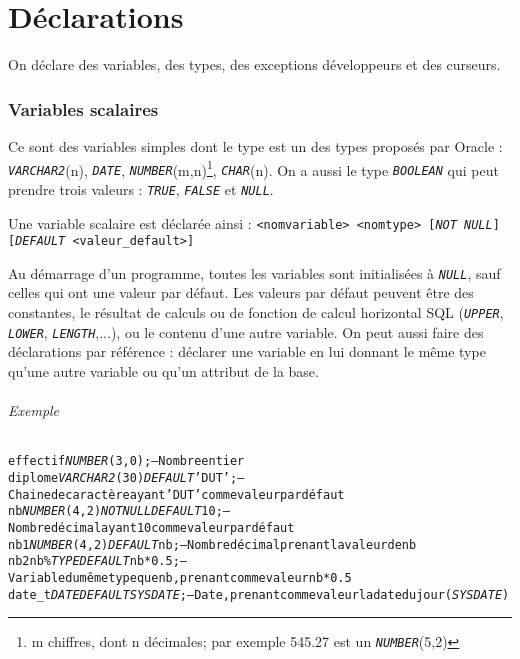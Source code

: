 \documentclass[10pt]{article}
\begin{document}
\newpage
\part{Déclarations}
	On déclare des variables, des types, des exceptions développeurs et des curseurs.
	
	\section{Variables scalaires}
		Ce sont des variables simples dont le type est un des types proposés par Oracle : \emph{\texttt{VARCHAR2}}(n), \emph{\texttt{DATE}}, \emph{\texttt{NUMBER}}(m,n)\footnote{m chiffres, dont n décimales; par exemple 545.27 est un \emph{\texttt{NUMBER}}(5,2)}, \emph{\texttt{CHAR}}(n). On a aussi le type \emph{\texttt{BOOLEAN}} qui peut prendre trois valeurs : \emph{\texttt{TRUE}}, \emph{\texttt{FALSE}} et \emph{\texttt{NULL}}.    
		
		Une variable scalaire est déclarée ainsi : \texttt{<nomvariable> <nomtype> [}\emph{\texttt{NOT NULL}}\texttt{] [}\emph{\texttt{DEFAULT}}\texttt{ <valeur\_default>]}
		
		Au démarrage d'un programme, toutes les variables sont initialisées à \emph{\texttt{NULL}}, sauf celles qui ont une valeur par défaut. Les valeurs par défaut peuvent être des constantes, le résultat de calculs ou de fonction de calcul horizontal SQL (\emph{\texttt{UPPER}}, \emph{\texttt{LOWER}}, \emph{\texttt{LENGTH}},...), ou le contenu d'une autre variable. On peut aussi faire des déclarations par référence : déclarer une variable en lui donnant le même type qu'une autre variable ou qu'un attribut de la base.
		
		\paragraph{Exemple}
			\begin{alltt}
				\begin{tabbing}
					effectif\= \emph{NUMBER}(3,0); -- Nombre entier\\
					diplome\> \emph{VARCHAR2}(30) \=\emph{DEFAULT} 'DUT'; -- Chaine de caractère ayant 'DUT' comme valeur par défaut\\
					nb		\> \emph{NUMBER}(4,2) \>\emph{NOT NULL DEFAULT} 10; -- Nombre décimal ayant 10 comme valeur par défaut\\
					nb1 	\> \emph{NUMBER}(4,2) \>\emph{DEFAULT} nb; -- Nombre décimal prenant la valeur de nb\\
					nb2		\> nb\%\emph{TYPE} \>\emph{DEFAULT} nb*0.5; -- Variable du même type que nb, prenant comme valeur nb*0.5\\
					date_t	\> \emph{DATE}		\>\emph{DEFAULT SYSDATE}; -- Date, prenant comme valeur la date du jour (\emph{SYSDATE})
				\end{tabbing}
			\end{alltt}
	
\end{document}
